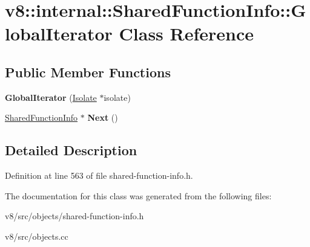 \hypertarget{classv8_1_1internal_1_1SharedFunctionInfo_1_1GlobalIterator}{}\section{v8\+:\+:internal\+:\+:Shared\+Function\+Info\+:\+:Global\+Iterator Class Reference}
\label{classv8_1_1internal_1_1SharedFunctionInfo_1_1GlobalIterator}
\subsection*{Public Member Functions}
\begin{DoxyCompactItemize}
\item 
\mbox{\label{classv8_1_1internal_1_1SharedFunctionInfo_1_1GlobalIterator_aaa04538485b5e98eee79e15f8e8e8582}} 
{\bfseries Global\+Iterator} (\mbox{\hyperlink{classv8_1_1internal_1_1Isolate}{Isolate}} $\ast$isolate)
\item 
\mbox{\label{classv8_1_1internal_1_1SharedFunctionInfo_1_1GlobalIterator_a5e264f0a79ccef2daf955265209d6963}} 
\mbox{\hyperlink{classv8_1_1internal_1_1SharedFunctionInfo}{Shared\+Function\+Info}} $\ast$ {\bfseries Next} ()
\end{DoxyCompactItemize}


\subsection{Detailed Description}


Definition at line 563 of file shared-\/function-\/info.\+h.



The documentation for this class was generated from the following files\+:\begin{DoxyCompactItemize}
\item 
v8/src/objects/shared-\/function-\/info.\+h\item 
v8/src/objects.\+cc\end{DoxyCompactItemize}
